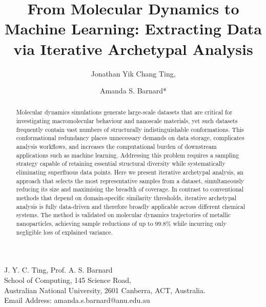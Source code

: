\documentclass{WileyMSP-template}
\begin{document}
\pagestyle{fancy}

\title{From Molecular Dynamics to Machine Learning: Extracting Data via Iterative Archetypal Analysis}

\maketitle

\author{Jonathan Yik Chang Ting,}
\author{Amanda S. Barnard*}

\dedication{}

\begin{affiliations}
J. Y. C. Ting, Prof. A. S. Barnard \\
School of Computing, 145 Science Road, \\
Australian National University, 2601 Canberra, ACT, Australia.\\
Email Address: amanda.s.barnard@anu.edu.au \par
\end{affiliations}




\begin{abstract}
Molecular dynamics simulations generate large-scale datasets that are critical for investigating macromolecular behaviour and nanoscale materials, yet such datasets frequently contain vast numbers of structurally indistinguishable conformations. This conformational redundancy places unnecessary demands on data storage, complicates analysis workflows, and increases the computational burden of downstream applications such as machine learning. Addressing this problem requires a sampling strategy capable of retaining essential structural diversity while systematically eliminating superfluous data points. Here we present iterative archetypal analysis, an approach that selects the most representative samples from a dataset, simultaneously reducing its size and maximising the breadth of coverage. In contrast to conventional methods that depend on domain-specific similarity thresholds, iterative archetypal analysis is fully data-driven and therefore broadly applicable across different chemical systems. The method is validated on molecular dynamics trajectories of metallic nanoparticles, achieving sample reductions of up to 99.8\% while incurring only negligible loss of explained variance.
\end{abstract}
\end{document}

